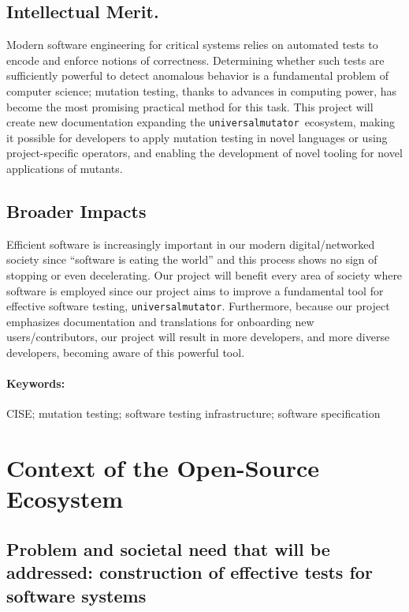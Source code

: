 \documentclass[numbers]{proposalnsf}
\newcommand{\um}{\texttt{universalmutator}}
\begin{document}
\subsection*{Intellectual Merit.} 
\vspace{-2mm}
Modern software engineering for critical systems relies on automated tests to encode and enforce notions of correctness.  Determining whether such tests are sufficiently powerful to detect anomalous behavior is a fundamental problem of computer science; mutation testing, thanks to advances in computing power, has become the most promising practical method for this task.  This project will create new documentation expanding the \um\ ecosystem, making it possible for developers to apply mutation testing in novel languages or using project-specific operators, and enabling the development of novel tooling for novel applications of mutants.
\subsection*{Broader Impacts}
\vspace{-2mm}

Efficient software is increasingly important in our modern digital/networked society since ``software is eating the world'' and this process shows no sign of stopping or even decelerating. 
Our project will benefit every area of society where software is employed since our project aims to improve a fundamental tool for effective software testing, \um.
Furthermore, because our project emphasizes documentation and translations for onboarding new users/contributors, our project will result in more developers, and more diverse developers, becoming aware of this powerful tool.

\paragraph{Keywords:}
CISE; mutation testing; software testing infrastructure; software specification

\newpage  
\section{Context of the Open-Source Ecosystem}%

\subsection{Problem and societal need that will be addressed: construction of effective tests for software systems}
\end{document}
